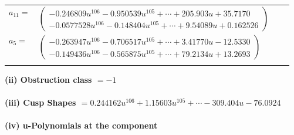 \documentclass[1p]{elsarticle_modified}
\theoremstyle{definition}
\begin{document}
\begin{tabular}{m{7pt} m{180pt} m{7pt} m{180pt} }
\flushright $a_{11}=$&$\begin{pmatrix}-0.246809 u^{106}-0.950539 u^{105}+\cdots+205.903 u+35.7170\\-0.0577528 u^{106}-0.148404 u^{105}+\cdots+9.54089 u+0.162526\end{pmatrix}$ \\
\flushright $a_{5}=$&$\begin{pmatrix}-0.263947 u^{106}-0.706517 u^{105}+\cdots+3.41770 u-12.5330\\-0.149436 u^{106}-0.565875 u^{105}+\cdots+79.2134 u+13.2693\end{pmatrix}$\\&\end{tabular}
\flushleft \textbf{(ii) Obstruction class $= -1$}\\~\\
\flushleft \textbf{(iii) Cusp Shapes $= 0.244162 u^{106}+1.15603 u^{105}+\cdots-309.404 u-76.0924$}\\~\\
\newpage\renewcommand{\arraystretch}{1}
\flushleft \textbf{(iv) u-Polynomials at the component}\newline \\
\end{document}
